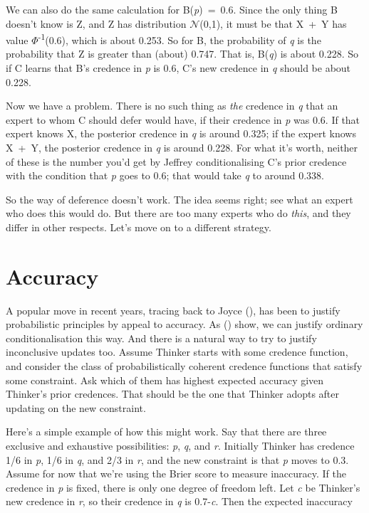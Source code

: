 \documentclass[
  10pt,
  letterpaper,
  DIV=11,
  numbers=noendperiod,
  twoside]{scrartcl}
\begin{document}
We can also do the same calculation for B(\emph{p})~=~0.6. Since the
only thing B doesn't know is Z, and Z has distribution
\(\mathcal{N}\)(0,1), it must be that X~+~Y has value
\(\Phi\)\textsuperscript{-1}(0.6), which is about 0.253. So for B, the
probability of \emph{q} is the probability that Z is greater than
(about) 0.747. That is, B(\emph{q}) is about 0.228. So if C learns that
B's credence in \emph{p} is 0.6, C's new credence in \emph{q} should be
about 0.228.

Now we have a problem. There is no such thing as \emph{the} credence in
\emph{q} that an expert to whom C should defer would have, if their
credence in \emph{p} was 0.6. If that expert knows X, the posterior
credence in \emph{q} is around 0.325; if the expert knows X~+~Y, the
posterior credence in \emph{q} is around 0.228. For what it's worth,
neither of these is the number you'd get by Jeffrey conditionalising C's
prior credence with the condition that \emph{p} goes to 0.6; that would
take \emph{q} to around 0.338.

So the way of deference doesn't work. The idea seems right; see what an
expert who does this would do. But there are too many experts who do
\emph{this}, and they differ in other respects. Let's move on to a
different strategy.

\section{Accuracy}\label{sec-accuracy}

A popular move in recent years, tracing back to Joyce
(), has been to justify probabilistic
principles by appeal to accuracy. As
() show,
we can justify ordinary conditionalisation this way. And there is a
natural way to try to justify inconclusive updates too. Assume Thinker
starts with some credence function, and consider the class of
probabilistically coherent credence functions that satisfy some
constraint. Ask which of them has highest expected accuracy given
Thinker's prior credences. That should be the one that Thinker adopts
after updating on the new constraint.

Here's a simple example of how this might work. Say that there are three
exclusive and exhaustive possibilities: \emph{p}, \emph{q}, and
\emph{r}. Initially Thinker has credence 1/6 in \emph{p}, 1/6 in
\emph{q}, and 2/3 in \emph{r}, and the new constraint is that \emph{p}
moves to 0.3. Assume for now that we're using the Brier score to measure
inaccuracy. If the credence in \emph{p} is fixed, there is only one
degree of freedom left. Let \emph{c} be Thinker's new credence in
\emph{r}, so their credence in \emph{q} is 0.7-\emph{c}. Then the
expected inaccuracy
\end{document}
